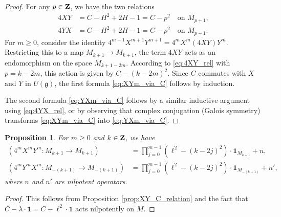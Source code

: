 \documentclass[a4paper,12pt,reqno]{amsart}
\newcommand{\ZZ}{{\rm\bf Z}}
\theoremstyle{plain}
\newtheorem{proposition}[theorem]{Proposition}
\theoremstyle{remark}
\begin{document}
  \begin{proof}
    For any $p \in \ZZ$, we have the two relations
    \begin{align}
      4XY &= C - H^2 + 2H - 1 = C-p^2 \quad\text{on } M_{p+1}, \label{eq:4XY_rel} \\
      4YX &= C - H^2 + 2H - 1 = C-p^2 \quad\text{on } M_{p-1}. \label{eq:4YX_rel}
    \end{align}
    For $m\ge 0$, consider the identity $4^{m+1}X^{m+1}Y^{m+1} = 4^m X^m(4XY)Y^m$. Restricting this to a map $M_{k+1} \to M_{k+1}$, the term $4XY$ acts as an endomorphism on the space $M_{k+1-2m}$. According to \eqref{eq:4XY_rel} with $p=k-2m$, this action is given by $C-(k-2m)^2$. Since $C$ commutes with $X$ and $Y$ in $U(\mathfrak{g})$, the first formula \eqref{eq:XYm_via_C} follows by induction.
    
    The second formula \eqref{eq:YXm_via_C} follows by a similar inductive argument using \eqref{eq:4YX_rel}, or by observing that complex conjugation (Galois symmetry) transforms \eqref{eq:XYm_via_C} into \eqref{eq:YXm_via_C}.
  \end{proof}
  
  \begin{proposition}
    For $m\ge 0$ and $k\in\ZZ$, we have
    \begin{align}
      \left(4^m X^m Y^m \colon M_{k+1} \to M_{k+1}\right) &= \prod_{j=0}^{m-1} \left(\ell^2 - (k-2j)^2\right) \cdot \mathbf{1}_{M_{k+1}} + n, \label{eq:XYm_nilp} \\
      \left(4^m Y^m X^m \colon M_{-(k+1)} \to M_{-(k+1)}\right) &= \prod_{j=0}^{m-1} \left(\ell^2 - (k-2j)^2\right) \cdot \mathbf{1}_{M_{-(k+1)}} + n', \label{eq:YXm_nilp}
    \end{align}
    where $n$ and $n'$ are nilpotent operators.
  \end{proposition}
  
  \begin{proof}
    This follows from Proposition \ref{prop:XY_C_relation} and the fact that $C - \lambda \cdot \mathbf{1} = C - \ell^2 \cdot \mathbf{1}$ acts nilpotently on $M$.
  \end{proof}
  
\end{document}
